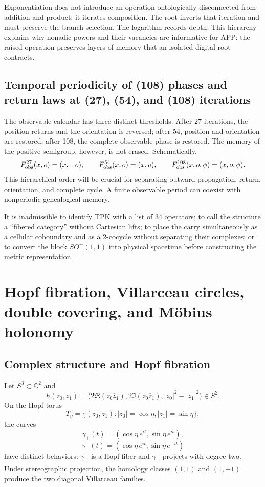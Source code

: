 Exponentiation does not introduce an operation ontologically disconnected from addition and
product: it iterates composition. The root inverts that iteration and must preserve
the branch selection. The logarithm records depth. This hierarchy explains
why nonadic powers and their vacancies are informative for APP: the raised
operation preserves layers of memory that an isolated digital root
contracts.

\subsection{Temporal periodicity of (108) phases and return laws at (27), (54), and (108) iterations}

The observable calendar has three distinct thresholds. After 27 iterations,
the position returns and the orientation is reversed; after 54, position
and orientation are restored; after 108, the complete observable phase is restored. The memory
of the positive semigroup, however, is not erased. Schematically,
\[
F_{\rm obs}^{27}(x,o)=(x,-o),\qquad
F_{\rm obs}^{54}(x,o)=(x,o),\qquad
F_{\rm obs}^{108}(x,o,\phi)=(x,o,\phi).
\]
This hierarchical order will be crucial for separating outward propagation, return,
orientation, and complete cycle. A finite observable period can coexist with
nonperiodic genealogical memory.

\begin{falsadorBox}[title={Type controls}] It is inadmissible to identify TPK with a list of 34 operators; to call the structure a “fibered category” without Cartesian lifts; to place the carry simultaneously as a cellular coboundary and as a 2-cocycle without separating their complexes; or to convert the block \(SO^+(1,1)\) into physical spacetime before constructing the metric representation.
\end{falsadorBox}


\section{Hopf fibration, Villarceau circles, double covering, and Möbius holonomy}

\subsection{Complex structure and Hopf fibration}

Let \(S^3\subset\mathbb C^2\) and
\[
h(z_0,z_1)=
\bigl(2\Re(z_0\overline z_1),
2\Im(z_0\overline z_1),|z_0|^2-|z_1|^2\bigr)
\in S^2.
\]
On the Hopf torus
\[
T_\eta=\{(z_0,z_1):|z_0|=\cos\eta,
|z_1|=\sin\eta\},
\]
the curves
\[
\gamma_+(t)=(\cos\eta\,e^{it},\sin\eta\,e^{it}),
\]
\[
\gamma_-(t)=(\cos\eta\,e^{it},\sin\eta\,e^{-it})
\]
have distinct behaviors: \(\gamma_+\) is a Hopf fiber and
\(\gamma_-\) projects with degree two. Under stereographic projection, the
homology classes \((1,1)\) and \((1,-1)\) produce the two diagonal
Villarceau families.

